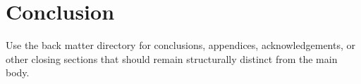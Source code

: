 \chapter{Conclusion}

Use the back matter directory for conclusions, appendices, acknowledgements, or other closing sections that should remain structurally distinct from the main body.

